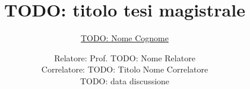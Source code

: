 
\title{TODO: titolo tesi magistrale} %
\author{\href{mailto:TODO: email@studenti.unimi.it}{TODO: Nome Cognome}} %
\date{
	Relatore: Prof. TODO: Nome Relatore\\ %
	Correlatore: TODO: Titolo Nome Correlatore\\ %
	TODO: data discussione} %
